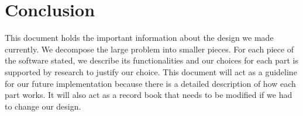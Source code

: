 \documentclass[onecolumn, draftclsnofoot, 10pt, compsoc]{IEEEtran}
\begin{document}
\section{Conclusion}
\begin{singlespace}
This document holds the important information about the design we made currently. We decompose the large problem into smaller pieces. For each piece of the software stated, we describe its functionalities and our choices for each part is supported by research to justify our choice. This document will act as a guideline for our future implementation because there is a detailed description of how each part works. It will also act as a record book that needs to be modified if we had to change our design.   
\end{singlespace}
\end{document}
